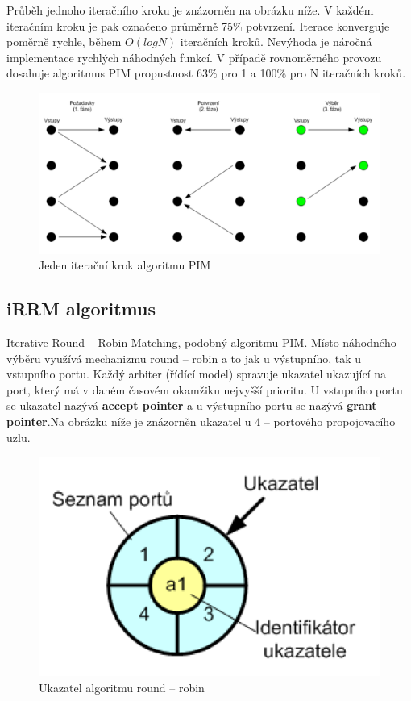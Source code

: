 Průběh jednoho iteračního kroku je znázorněn na obrázku níže. V každém iteračním kroku je pak označeno průměrně 75\% potvrzení. Iterace konverguje poměrně rychle, během $O(logN)$ iteračních kroků. Nevýhoda je náročná implementace rychlých náhodných funkcí. V případě rovnoměrného provozu dosahuje algoritmus PIM propustnost 63\% pro 1 a 100\% pro N iteračních kroků.
\begin{figure}[ht]
\centering
  \begin{center}
    \includegraphics[scale=0.5]{BPC-HWS/images/PIM.png}
  \end{center}
  \caption[Jeden iterační krok algoritmu PIM)]{Jeden iterační krok algoritmu PIM}
\end{figure}
\subsection{iRRM algoritmus}
Iterative Round -- Robin Matching, podobný algoritmu PIM. Místo náhodného výběru využívá mechanizmu round -- robin a to jak u výstupního, tak u vstupního portu. Každý arbiter (řídící model) spravuje ukazatel ukazující na port, který má v daném časovém okamžiku nejvyšší prioritu. U vstupního portu se ukazatel nazývá \textbf{accept pointer} a u výstupního portu se nazývá \textbf{grant pointer}.Na obrázku níže je znázorněn ukazatel u 4 -- portového propojovacího uzlu.
\begin{figure}[ht]
\centering
  \begin{center}
    \includegraphics[scale=0.5]{BPC-HWS/images/iRRM.png}
  \end{center}
  \caption[Ukazatel algoritmu round -- robin]{Ukazatel algoritmu round -- robin}
\end{figure}
